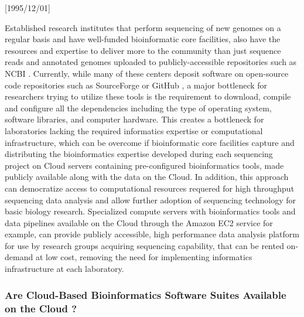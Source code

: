 \NeedsTeXFormat{LaTeX2e}[1995/12/01] \documentclass[10pt]{bmc_article}
\newenvironment{bmcformat}{\begin{raggedright}\baselineskip20pt\sloppy\setboolean{publ}{false}}{\end{raggedright}\baselineskip20pt\sloppy}
\begin{document}
\begin{bmcformat}
Established research institutes that perform sequencing of new genomes on a regular basis and have well-funded bioinformatic 
core facilities, also have the resources and expertise to deliver more to the community than just sequence reads and annotated 
genomes uploaded to publicly-accessible repositories such as NCBI \cite{Pruitt2009}.  Currently, while many of these centers 
deposit software on open-source code repositories such as SourceForge \cite{sourceforge} or GitHub \cite{github}, a major 
bottleneck for researchers trying to utilize these tools is the requirement to download, compile and configure all the 
dependencies including the type of operating system, software libraries, and computer hardware. This creates a bottleneck 
for laboratories lacking the required informatics expertise or computational infrastructure, which can be overcome if bioinformatic
core facilities capture and distributing the bioinformatics expertise developed during each sequencing project on Cloud servers 
containing pre-configured bioinformatics tools, made publicly available along with the data on the Cloud. In addition, this 
approach can democratize access to computational resources requered for high throughput sequencing data analysis and 
allow further  adoption of sequencing technology for basic biology research. Specialized compute servers with bioinformatics tools 
and data pipelines available on the Cloud through the Amazon EC2 service for example, can provide publicly accessible, 
high performance data analysis platform for use by research groups acquiring sequencing capability, that can be rented 
on-demand at low cost, removing the need for implementing informatics infrastructure at each laboratory.  


\subsubsection*{Are Cloud-Based Bioinformatics Software Suites Available on the Cloud ?}
  

\end{bmcformat}
\end{document}
